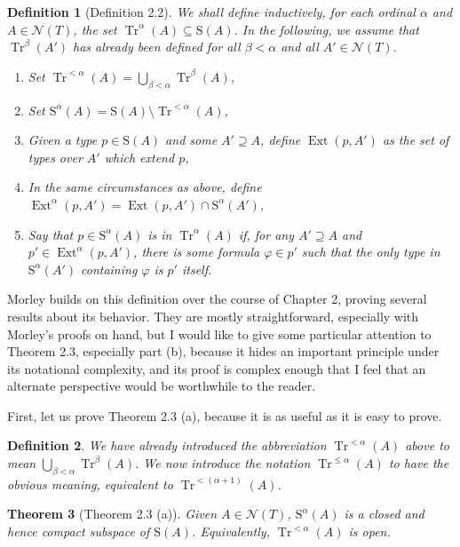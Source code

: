 \documentclass{article}
\newtheorem{theorem}{Theorem}[section]
\newtheorem{definition}[theorem]{Definition}
\theoremstyle{nonumberplain}
\newcommand{\calN}{\mathcal{N}}
\newcommand{\Stone}{\mathrm{S}}
\DeclareMathOperator{\Tr}{Tr}
\DeclareMathOperator{\Ext}{Ext}
\begin{document}
\begin{definition}[Definition 2.2]\label{def:mrk}
We shall define inductively, for each ordinal $\alpha$ and $A \in \calN(T)$, the set $\Tr^\alpha(A) \subseteq \Stone(A)$. In the following, we assume that $\Tr^\beta(A')$ has already been defined for all $\beta < \alpha$ and all $A' \in \calN(T)$.
\begin{enumerate}[label=(\roman*)]
\item Set $\Tr^{<\alpha}(A) = \bigcup_{\beta < \alpha} \Tr^\beta(A)$,
\item Set $\Stone^\alpha(A) = \Stone(A) \setminus \Tr^{<\alpha}(A)$,
\item Given a type $p \in \Stone(A)$ and some $A' \supseteq A$, define $\Ext(p,A')$ as the set of types over $A'$ which extend $p$,
\item In the same circumstances as above, define $\Ext^\alpha(p,A') = \Ext(p,A') \cap \Stone^\alpha(A')$,
\item\label{item:mrk:def} Say that $p \in \Stone^\alpha(A)$ is in $\Tr^\alpha(A)$ if, for any $A' \supseteq A$ and $p' \in \Ext^\alpha(p,A')$, there is some formula $\varphi \in p'$ such that the only type in $\Stone^\alpha(A')$ containing $\varphi$ is $p'$ itself.
\end{enumerate}
\end{definition}

Morley builds on this definition over the course of Chapter 2, proving several results about its behavior. They are mostly straightforward, especially with Morley's proofs on hand, but I would like to give some particular attention to Theorem 2.3, especially part (b), because it hides an important principle under its notational complexity, and its proof is complex enough that I feel that an alternate perspective would be worthwhile to the reader.

First, let us prove Theorem 2.3 (a), because it is as useful as it is easy to prove.

\begin{definition}
We have already introduced the abbreviation $\Tr^{<\alpha}(A)$ above to mean $\bigcup_{\beta < \alpha} \Tr^\beta(A)$. We now introduce the notation $\Tr^{\leq\alpha}(A)$ to have the obvious meaning, equivalent to $\Tr^{<(\alpha+1)}(A)$.
\end{definition}

\begin{theorem}[Theorem 2.3 (a)]\label{thm:compact}
Given $A \in \calN(T)$, $\Stone^\alpha(A)$ is a closed and hence compact subspace of $\Stone(A)$. Equivalently, $\Tr^{<\alpha}(A)$ is open.
\end{theorem}
\end{document}
